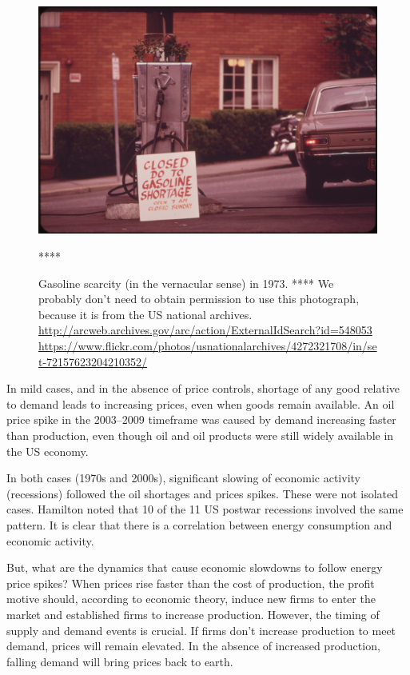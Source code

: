 \begin{figure}[!ht]
\centering\
\includegraphics[width=\linewidth]{Part_0/Chapter_Introduction/images/gas_shortage_1973.jpg}
\caption[Gasoline shortage]{Gasoline scarcity (in the vernacular sense) in 1973.
**** We probably don't need to obtain permission to use this photograph, because
it is from the US national archives.
\url{http://arcweb.archives.gov/arc/action/ExternalIdSearch?id=548053}
\url{https://www.flickr.com/photos/usnationalarchives/4272321708/in/set-72157623204210352/}}
****
\label{fig:gas_shortage}
\end{figure}

In mild cases, and in the absence of price controls, 
shortage of any good relative to demand leads to increasing prices,
even when goods remain available.
An oil price spike in the 2003--2009 timeframe
was caused by demand increasing faster than production,
even though oil and oil products were still widely available in the US economy.

In both cases (1970s and 2000s), 
significant slowing of economic activity (recessions)
followed the oil shortages and prices spikes.
These were not isolated cases.
Hamilton noted that 
10 of the 11 US postwar recessions 
involved the same pattern.\cite[p.~45]{Hamilton:2013vc}
It is clear that 
there is a correlation between energy consumption and economic activity.

But, what are the dynamics that cause economic slowdowns 
to follow energy price spikes?
When prices rise faster than the cost of production, 
the profit motive should, according to economic theory, induce 
new firms to enter the market and
established firms to increase production.
However, the timing of supply and demand events is crucial.
If firms don't increase production to meet demand, 
prices will remain elevated.
In the absence of increased production, falling demand will 
bring prices back to earth.

